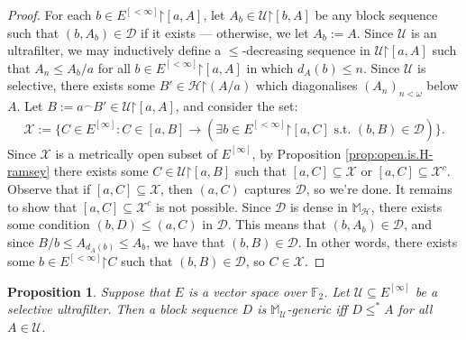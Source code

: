 \documentclass[11pt,reqno]{amsart}
\theoremstyle{plain}
\numberwithin{equation}{section}
\newtheorem{proposition}[theorem]{Proposition}
\theoremstyle{definition}
\newcommand{\cal}{\mathcal}
\newcommand{\restrictedto}{\mathord{\upharpoonright}}
\newcommand{\U}{\cal{U}}
\newcommand{\X}{\cal{X}}
\renewcommand{\H}{\cal{H}}
\newcommand{\D}{\cal{D}}
\begin{document}
\begin{proof}
    For each $b \in E^{[<\infty]}\restrictedto[a,A]$, let $A_b \in \U\restrictedto[b,A]$ be any block sequence such that $(b,A_b)\in \D$ if it exists --- otherwise, we let $A_b := A$. Since $\U$ is an ultrafilter, we may inductively define a $\leq$-decreasing sequence in $\U\restrictedto[a,A]$ such that $A_n \leq A_b/a$ for all $b \in E^{[<\infty]}\restrictedto[a,A]$ in which $d_A(b) \leq n$. Since $\U$ is selective, there exists some $B' \in \H\restrictedto(A/a)$ which diagonalises $(A_n)_{n<\omega}$ below $A$. Let $B := a^\frown B' \in \U\restrictedto[a,A]$, and consider the set:
    \begin{align*}
        \X := \{C \in E^{[\infty]} : C \in [a,B] \to (\exists b \in E^{[<\infty]}\restrictedto[a,C] \text{ s.t. } (b,B) \in \D)\}.
    \end{align*}
    Since $\X$ is a metrically open subset of $E^{[\infty]}$, by Proposition \ref{prop:open.is.H-ramsey} there exists some $C \in \U\restrictedto[a,B]$ such that $[a,C] \subseteq \X$ or $[a,C] \subseteq \X^c$. Observe that if $[a,C] \subseteq \X$, then $(a,C)$ captures $\D$, so we're done. It remains to show that $[a,C] \subseteq \X^c$ is not possible. Since $\D$ is dense in $\mathbb{M}_\H$, there exists some condition $(b,D) \leq (a,C)$ in $\D$. This means that $(b,A_b) \in \D$, and since $B/b \leq A_{d_A(b)} \leq A_b$, we have that $(b,B) \in \D$. In other words, there exists some $b \in E^{[<\infty]}\restrictedto C$ such that $(b,B) \in \D$, so $C \in \X$.
\end{proof}

\begin{proposition}
\label{prop:M-generic.characterisation}
    Suppose that $E$ is a vector space over $\mathbb{F}_2$. Let $\U \subseteq E^{[\infty]}$ be a selective ultrafilter. Then a block sequence $D$ is $\mathbb{M}_\U$-generic iff $D \leq^* A$ for all $A \in \U$.
\end{proposition}
\end{document}

